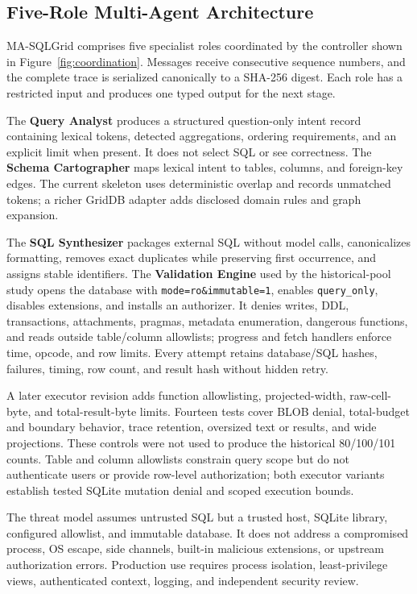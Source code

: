 \documentclass[applsci,article,submit,moreauthors]{Definitions/mdpi}
\newcommand{\masql}{MA-SQLGrid}
\begin{document}
\subsection{Five-Role Multi-Agent Architecture}

\masql{} comprises five specialist roles coordinated by the controller shown in Figure~\ref{fig:coordination}. Messages receive consecutive sequence numbers, and the complete trace is serialized canonically to a SHA-256 digest. Each role has a restricted input and produces one typed output for the next stage.

The \textbf{Query Analyst} produces a structured question-only intent record containing lexical tokens, detected aggregations, ordering requirements, and an explicit limit when present. It does not select SQL or see correctness. The \textbf{Schema Cartographer} maps lexical intent to tables, columns, and foreign-key edges. The current skeleton uses deterministic overlap and records unmatched tokens; a richer GridDB adapter adds disclosed domain rules and graph expansion.

The \textbf{SQL Synthesizer} packages external SQL without model calls, canonicalizes formatting, removes exact duplicates while preserving first occurrence, and assigns stable identifiers. The \textbf{Validation Engine} used by the historical-pool study opens the database with \texttt{mode=ro\&immutable=1}, enables \texttt{query\_only}, disables extensions, and installs an authorizer. It denies writes, DDL, transactions, attachments, pragmas, metadata enumeration, dangerous functions, and reads outside table/column allowlists; progress and fetch handlers enforce time, opcode, and row limits. Every attempt retains database/SQL hashes, failures, timing, row count, and result hash without hidden retry.

A later executor revision adds function allowlisting, projected-width, raw-cell-byte, and total-result-byte limits. Fourteen tests cover BLOB denial, total-budget and boundary behavior, trace retention, oversized text or results, and wide projections. These controls were not used to produce the historical 80/100/101 counts. Table and column allowlists constrain query scope but do not authenticate users or provide row-level authorization; both executor variants establish tested SQLite mutation denial and scoped execution bounds.

The threat model assumes untrusted SQL but a trusted host, SQLite library, configured allowlist, and immutable database. It does not address a compromised process, OS escape, side channels, built-in malicious extensions, or upstream authorization errors. Production use requires process isolation, least-privilege views, authenticated context, logging, and independent security review.
\end{document}
